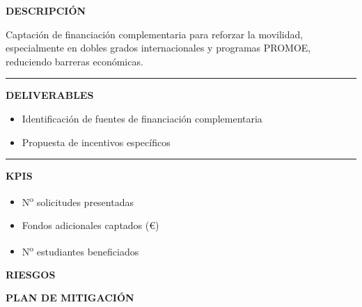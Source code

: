 \documentclass[11pt,a4paper]{scrreprt}
\newcommand{\fieldlabel}[1]{%
  {\footnotesize\sffamily\bfseries\color{mutedcolor}\MakeUppercase{#1}}\par\nopagebreak[4]
}
\newcommand{\fieldsep}{\vspace{3pt}\noindent\textcolor{bordercolor}{\rule{\linewidth}{0.4pt}}\vspace{3pt}\par}
\begin{document}
\begin{tcolorbox}[pabox={fgcolor}{PA4.2 \enspace\textbullet\enspace Incentivos a la movilidad mediante captación de fondos adicionales}]

\fieldlabel{Descripci\'on}
{\small Captación de financiación complementaria para reforzar la movilidad, especialmente en dobles grados internacionales y programas PROMOE, reduciendo barreras económicas.}\par
\fieldsep
\fieldlabel{Deliverables}
{\small \begin{itemize}[noitemsep,topsep=2pt]
\item Identificación de fuentes de financiación complementaria
\item Propuesta de incentivos específicos
\end{itemize}}\par
\fieldsep
\fieldlabel{KPIs}
{\small \begin{itemize}[noitemsep,topsep=2pt]
\item N\textsuperscript{o} solicitudes presentadas
\item Fondos adicionales captados (€)
\item N\textsuperscript{o} estudiantes beneficiados
\end{itemize}}\par
\end{tcolorbox}
\begin{tcolorbox}[riskbox]
{\footnotesize\sffamily\bfseries\color{red!50!black} RIESGOS}\par{}
\end{tcolorbox}
\begin{tcolorbox}[mitbox]
{\footnotesize\sffamily\bfseries\color{green!40!black} PLAN DE MITIGACI\'ON}\par{}
\end{tcolorbox}
\vspace{8pt}
\end{document}
